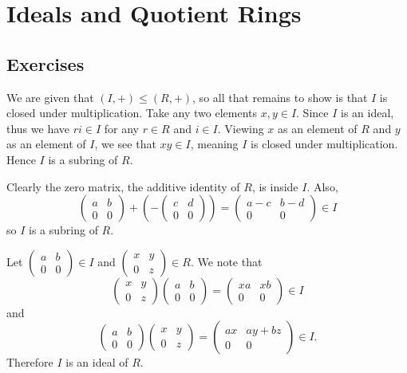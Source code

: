 \section{Ideals and Quotient Rings}
\subsection*{Exercises}
\begin{questions}
    \item We are given that $(I, +) \leq (R,+)$, so all that remains to show is that $I$ is closed under multiplication. Take any two elements $x, y \in I$. Since $I$ is an ideal, thus we have $ri \in I$ for any $r \in R$ and $i \in I$. Viewing $x$ as an element of $R$ and $y$ as an element of $I$, we see that $xy \in I$, meaning $I$ is closed under multiplication. Hence $I$ is a subring of $R$.

    \item \begin{partquestions}{\roman*}
        \item Clearly the zero matrix, the additive identity of $R$, is inside $I$. Also,
        \[
            \begin{pmatrix}a&b\\0&0\end{pmatrix} + \left(-\begin{pmatrix}c&d\\0&0\end{pmatrix}\right) = \begin{pmatrix}a-c&b-d\\0&0\end{pmatrix} \in I
        \]
        so $I$ is a subring of $R$.

        \item Let $\begin{pmatrix}a&b\\0&0\end{pmatrix} \in I$ and $\begin{pmatrix}x&y\\0&z\end{pmatrix} \in R$. We note that
        \[
            \begin{pmatrix}x&y\\0&z\end{pmatrix}\begin{pmatrix}a&b\\0&0\end{pmatrix} = \begin{pmatrix}xa&xb\\0&0\end{pmatrix} \in I
        \]
        and
        \[
            \begin{pmatrix}a&b\\0&0\end{pmatrix}\begin{pmatrix}x&y\\0&z\end{pmatrix} = \begin{pmatrix}ax&ay+bz\\0&0\end{pmatrix} \in I.
        \]
        Therefore $I$ is an ideal of $R$.


\end{partquestions}
\end{questions}
